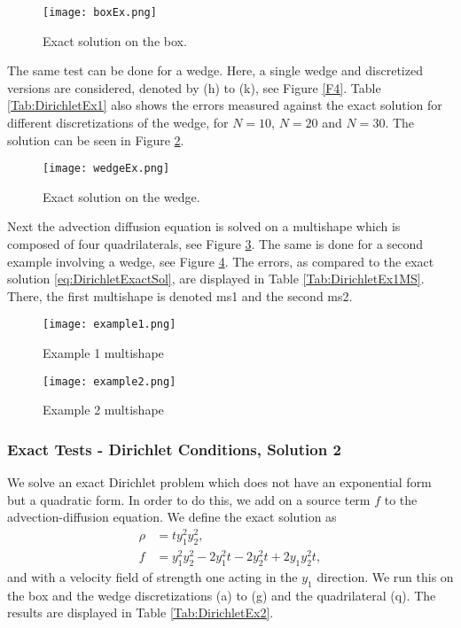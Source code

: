 	\begin{figure}[h]
		\centering
		\texttt{[image: boxEx.png]}
		\caption{Exact solution on the box.} 
		\label{F3}
	\end{figure}


The same test can be done for a wedge. Here, a single wedge and discretized versions are considered, denoted by (h) to (k), see Figure \ref{F4}. Table \ref{Tab:DirichletEx1} also shows the errors measured against the exact solution for different discretizations of the wedge, for $N = 10$, $N = 20$ and $N = 30$. The solution can be seen in Figure \ref{F5}.


\begin{figure}[h]
	\centering
	\texttt{[image: wedgeEx.png]}
	\caption{Exact solution on the wedge.} 
	\label{F5}
\end{figure}

Next the advection diffusion equation is solved on a multishape which is composed of four quadrilaterals, see Figure \ref{F6}.  The same is done for a second example involving a wedge, see Figure \ref{F7}.  The errors, as compared to the exact solution \eqref{eq:DirichletExactSol}, are displayed in Table \ref{Tab:DirichletEx1MS}. There, the first multishape is denoted ms1 and the second ms2.
\begin{figure}[h]
	\centering
	\texttt{[image: example1.png]}
	\caption{Example 1 multishape} 
	\label{F6}
\end{figure}


\begin{figure}[h]
	\centering
	\texttt{[image: example2.png]}
	\caption{Example 2 multishape} 
	\label{F7}
\end{figure}




\subsubsection{Exact Tests - Dirichlet Conditions, Solution 2}

We solve an exact Dirichlet problem which does not have an exponential form but a quadratic form. In order to do this, we add on a source term $f$ to the advection-diffusion equation.
We define the exact solution as
\begin{align*}
	\rho &= t y_1^2 y_2^2,\\
	f &= y_1^2 y_2^2 - 2 y_1^2 t - 2 y_2^2 t + 2 y_1 y_2^2 t,
\end{align*}
and with a velocity field of strength one acting in the $y_1$ direction.
We run this on the box and the wedge discretizations (a) to (g) and the quadrilateral (q). The results are displayed in Table \ref{Tab:DirichletEx2}.



